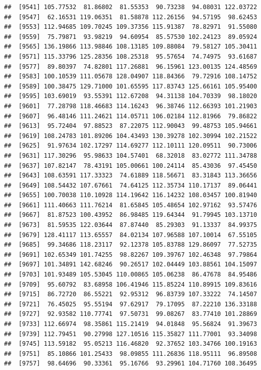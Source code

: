 \documentclass[
]{article}
\begin{document}
\begin{verbatim}
##  [9541] 105.77532  81.86802  81.55353  90.73238  94.08031 122.03722
##  [9547]  62.16531 119.06351  81.58878 112.26156  94.57195  98.62453
##  [9553] 112.94685 109.70245 109.37356 115.91387  78.82971  91.55080
##  [9559]  75.79871  93.98219  94.60954  85.57530 102.24123  89.05924
##  [9565] 136.19866 113.98846 108.13185 109.88084  79.58127 105.30411
##  [9571] 115.33796 125.28356 108.25318  95.57654  74.74975  93.61687
##  [9577]  89.80397  74.82801 117.26881  96.15961 123.00135 124.48569
##  [9583] 100.10539 111.05678 128.04907 118.84366  79.72916 108.14752
##  [9589] 100.38475 129.71000 101.65595 117.83743 125.66161 105.95400
##  [9595] 103.69019  93.55391 112.67208  94.31138 104.70339  98.18020
##  [9601]  77.28798 118.46683 114.16243  96.38746 112.66393 101.21903
##  [9607]  96.48146 111.24621 114.05711 106.02184 112.81966  79.86822
##  [9613]  95.72404  97.88523  87.22075 112.90043  99.48753 105.94661
##  [9619] 108.24783 101.89206 104.43493 130.39278 102.30994 102.21522
##  [9625]  91.97634 102.17297 114.69277 112.10111 120.09511  90.73006
##  [9631] 117.30296  95.98633 104.57401  68.32018  83.02772 111.34788
##  [9637] 107.82147  78.43191 105.00661 100.24114  85.43036  97.45450
##  [9643] 108.63591 117.33323  74.61889 118.56671  83.31843 113.36656
##  [9649] 108.54432 107.67661  74.64125 112.35734 110.17137  89.06441
##  [9655] 100.70038 110.10928 114.19642 116.14232 108.03457 100.81940
##  [9661] 111.40663 111.76214  81.65845 105.48654 102.97162  93.57476
##  [9667]  81.87523 100.43952  86.98485 119.64344  91.79945 103.13710
##  [9673]  81.59535 122.03644  87.87440  85.29303  91.13337  84.99375
##  [9679] 128.41117 113.65557  84.02134 107.96588 107.10014  67.55105
##  [9685]  99.34686 118.23117  92.12378 105.83788 129.86097  77.52735
##  [9691] 102.65349 101.74255  98.82267 109.39767 102.46348  97.79864
##  [9697] 101.34891 142.68246  90.26517 102.04449 103.88561 104.15097
##  [9703] 101.93489 105.53045 110.00865 105.06238  86.47678  84.95486
##  [9709]  95.60792  83.68958 106.41946 115.85224 110.89915 109.83616
##  [9715]  86.72720  86.55221  92.95312  96.83739 107.33222  74.14507
##  [9721]  76.45025  95.55194  97.62917  79.17095  87.22210 136.33188
##  [9727]  92.93582 110.77741  97.50731  99.08267  83.77410 101.28869
##  [9733] 112.66974  98.35861 115.21419  94.01848  95.56824  91.39673
##  [9739] 112.79451  90.27998 127.10516 115.35827 111.77001  93.34098
##  [9745] 113.59182  95.05213 116.46820  92.37652 103.34766 100.19163
##  [9751]  85.10866 101.25433  98.09855 111.26836 118.95111  96.89508
##  [9757]  98.64696  90.33361  95.16766  93.29961 104.71760 108.36495

\end{verbatim}
\end{document}
